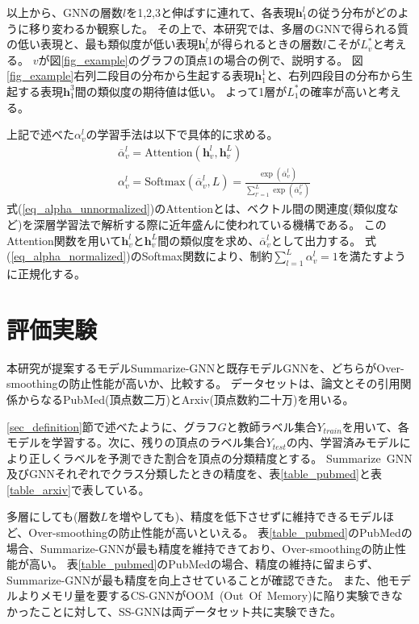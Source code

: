 \documentclass[a4j,twocolumn]{jsarticle}
\begin{document}
以上から、GNNの層数$l$を1,2,3と伸ばすに連れて、各表現$\bm{h}_1^l$の従う分布がどのように移り変わるか観察した。
その上で、本研究では、多層のGNNで得られる質の低い表現と、最も類似度が低い表現$\bm{h}_v^l$が得られるときの層数$l$こそが$L_v^*$と考える。
$v$が図\ref{fig_example}のグラフの頂点1の場合の例で、説明する。
図\ref{fig_example}右列二段目の分布から生起する表現$\bm{h}_1^1$と、右列四段目の分布から生起する表現$\bm{h}_1^3$間の類似度の期待値は低い。
よって1層が$L_1^*$の確率が高いと考える。


上記で述べた$\alpha_v^l$の学習手法は以下で具体的に求める。
\begin{align}
  & \overline{\alpha}_v^l = \text{Attention}(\bm{h}_v^l, \bm{h}_v^L) \label{eq_alpha_unnormalized} \\
  & \alpha_v^l = \text{Softmax}(\overline{\alpha}_v^l, L) = \frac{\exp(\overline{\alpha}_v^l)}{\sum_{l'=1}^L \exp(\overline{\alpha}_v^{l'})} \label{eq_alpha_normalized}
\end{align}
式(\ref{eq_alpha_unnormalized})のAttentionとは、ベクトル間の関連度(類似度など)を深層学習法で解析する際に近年盛んに使われている機構である。
このAttention関数を用いて$\bm{h}_v^l$と$\bm{h}_v^L$間の類似度を求め、$\overline{\alpha}_v^l$として出力する。
式(\ref{eq_alpha_normalized})のSoftmax関数により、制約$\sum_{l=1}^L \alpha_v^l=1$を満たすように正規化する。


\section{評価実験}
\label{sec_experiment}

本研究が提案するモデルSummarize-GNNと既存モデルGNNを、どちらがOver-smoothingの防止性能が高いか、比較する。
データセットは、論文とその引用関係からなるPubMed(頂点数二万)とArxiv(頂点数約二十万)を用いる。

\ref{sec_definition}節で述べたように、グラフ$G$と教師ラベル集合$Y_{train}$を用いて、各モデルを学習する。次に、残りの頂点のラベル集合$Y_{test}$の内、学習済みモデルにより正しくラベルを予測できた割合を頂点の分類精度とする。
Summarize~GNN及びGNNそれぞれでクラス分類したときの精度を、表\ref{table_pubmed}と表\ref{table_arxiv}で表している。

多層にしても(層数$L$を増やしても)、精度を低下させずに維持できるモデルほど、Over-smoothingの防止性能が高いといえる。
表\ref{table_pubmed}のPubMedの場合、Summarize-GNNが最も精度を維持できており、Over-smoothingの防止性能が高い。
表\ref{table_pubmed}のPubMedの場合、精度の維持に留まらず、Summarize-GNNが最も精度を向上させていることが確認できた。
また、他モデルよりメモリ量を要するCS-GNNがOOM~(Out~Of~Memory)に陥り実験できなかったことに対して、SS-GNNは両データセット共に実験できた。
\end{document}
